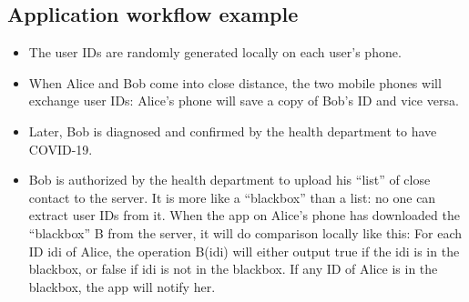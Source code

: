   \subsection{Application workflow example}
    \begin{itemize}
      \item The user IDs are randomly generated locally on each user’s phone.
      \item When Alice and Bob come into close distance, the two mobile phones will exchange user IDs: Alice’s phone will save a copy of Bob’s ID and vice versa.
      \item Later, Bob is diagnosed and confirmed by the health department to have COVID-19.
      \item Bob is authorized by the health department to upload his “list” of close contact to the server. It is more like a “blackbox” than a list: no one can extract user IDs from it. When the app on Alice’s phone has downloaded the “blackbox” B from the server, it will do comparison locally like this: For each ID idi of Alice, the operation B(idi) will either output true if the idi is in the blackbox, or false if idi is not in the blackbox. If any ID of Alice is in the blackbox, the app will notify her.
    \end{itemize}      
    
